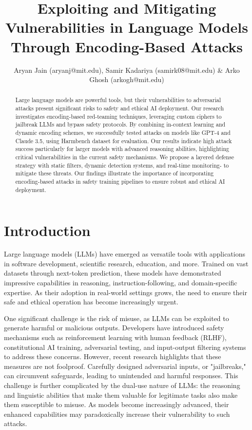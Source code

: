 \documentclass{article} %
\title{Exploiting and Mitigating Vulnerabilities in Language Models Through Encoding-Based Attacks}
\author{Aryan Jain (aryanj@mit.edu), Samir Kadariya (samirk08@mit.edu) \& Arko Ghosh (arkogh@mit.edu)
}
\begin{document}
\maketitle

\begin{abstract}
Large language models are powerful tools, but their vulnerabilities to adversarial attacks present significant risks to safety and ethical AI deployment. Our research investigates encoding-based red-teaming techniques, leveraging custom ciphers to jailbreak LLMs and bypass safety protocols. By combining in-context learning and dynamic encoding schemes, we successfully tested attacks on models like GPT-4 and Claude 3.5, using Harmbench dataset for evaluation. Our results indicate high attack success particularly for larger models with advanced reasoning abilities, highlighting critical vulnerabilities in the current safety mechanisms. We propose a layered defense strategy with static filters, dynamic detection systems, and real-time monitoring- to mitigate these threats. Our findings illustrate the importance of incorporating encoding-based attacks in safety training pipelines to ensure robust and ethical AI deployment. 
\end{abstract}



\section{Introduction}


Large language models (LLMs) have emerged as versatile tools with applications in software development, scientific research, education, and more. Trained on vast datasets through next-token prediction, these models have demonstrated impressive capabilities in reasoning, instruction-following, and domain-specific expertise. As their adoption in real-world settings grows, the need to ensure their safe and ethical operation has become increasingly urgent.

One significant challenge is the risk of misuse, as LLMs can be exploited to generate harmful or malicious outputs. Developers have introduced safety mechanisms such as reinforcement learning with human feedback (RLHF), constitutional AI training, adversarial testing, and input-output filtering systems to address these concerns. However, recent research highlights that these measures are not foolproof. Carefully designed adversarial inputs, or "jailbreaks," can circumvent safeguards, leading to unintended and harmful responses. This challenge is further complicated by the dual-use nature of LLMs: the reasoning and linguistic abilities that make them valuable for legitimate tasks also make them susceptible to misuse. As models become increasingly advanced, their enhanced capabilities may paradoxically increase their vulnerability to such attacks.
\end{document}
